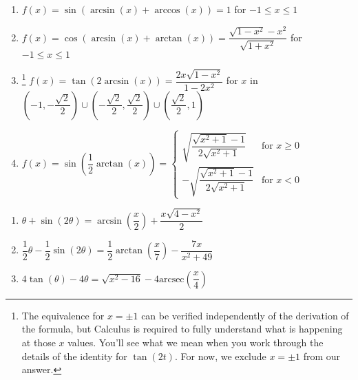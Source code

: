 \begin{enumerate}
\item $f(x) =\sin \left( \arcsin(x) + \arccos(x) \right) = 1$ for $-1 \leq x \leq 1$
\item $f(x) =\cos \left( \arcsin(x) + \arctan(x) \right) = \dfrac{\sqrt{1 - x^{2}} - x^{2}}{\sqrt{1 + x^{2}}}$ for $-1 \leq x \leq 1$
\item\!\!\footnote{The equivalence for $x = \pm 1$ can be verified independently of the derivation of the formula, but Calculus is required to fully understand what is happening at those $x$ values.  You'll see what we mean when you work through the details of the identity for $\tan(2t).$  For now, we exclude $x = \pm 1$ from our answer.} $f(x) =\tan \left( 2\arcsin(x) \right) = \dfrac{2x\sqrt{1 - x^{2}}}{1 - 2x^{2}}$ for $x$ in $\left(-1, -\dfrac{\sqrt{2}}{2}\right) \cup \left(-\dfrac{\sqrt{2}}{2}, \dfrac{\sqrt{2}}{2} \right) \cup \left(\dfrac{\sqrt{2}}{2}, 1\right)$
\item $f(x) =\sin \left( \dfrac{1}{2}\arctan(x) \right) = \left\{ \begin{array}{rr} \sqrt{\dfrac{\sqrt{x^{2} + 1} - 1}{2\sqrt{x^{2} + 1}}} & \text{for $x \geq 0$} \\ [10pt] -\sqrt{\dfrac{\sqrt{x^{2} + 1} - 1}{2\sqrt{x^{2} + 1}}} & \text{for $x < 0$}  \end{array}\right. $ 

\setcounter{HW}{\value{enumi}}

\end{enumerate}

\begin{enumerate}

\setcounter{enumi}{\value{HW}}

\item  $\theta + \sin(2\theta) = \arcsin \left( \dfrac{x}{2} \right) + \dfrac{x\sqrt{4 - x^{2}}}{2}$

\item  $\dfrac{1}{2}\theta - \dfrac{1}{2}\sin(2\theta) = \dfrac{1}{2} \arctan \left( \dfrac{x}{7} \right) - \dfrac{7x}{x^{2} + 49}$

\item   $4\tan(\theta) - 4\theta = \sqrt{x^{2} - 16} - 4\mbox{arcsec} \left( \dfrac{x}{4} \right)$

\setcounter{HW}{\value{enumi}}

\end{enumerate}

